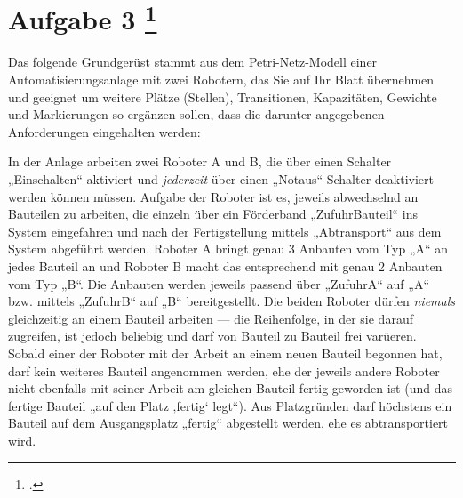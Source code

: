 \documentclass{lehramt-informatik-aufgabe}
\begin{document}
\section{Aufgabe 3
\footcite{examen:66116:2015:03}}

Das folgende Grundgerüst stammt aus dem Petri-Netz-Modell einer
Automatisierungsanlage mit zwei Robotern, das Sie auf Ihr Blatt
übernehmen und geeignet um weitere Plätze (Stellen), Transitionen,
Kapazitäten, Gewichte und Markierungen so ergänzen sollen, dass die
darunter angegebenen Anforderungen eingehalten werden:

In der Anlage arbeiten zwei Roboter A und B, die über einen Schalter
„Einschalten“ aktiviert und \emph{jederzeit} über einen
„Notaus“-Schalter deaktiviert werden können müssen. Aufgabe der Roboter ist es,
jeweils abwechselnd an Bauteilen zu arbeiten, die einzeln über ein
Förderband „ZufuhrBauteil“ ins System eingefahren und nach der
Fertigstellung mittels „Abtransport“ aus dem System abgeführt werden.
Roboter A bringt genau 3 Anbauten vom Typ „A“ an jedes Bauteil an und
Roboter B macht das entsprechend mit genau 2 Anbauten vom Typ „B“. Die
Anbauten werden jeweils passend über „ZufuhrA“ auf „A“ bzw. mittels
„ZufuhrB“ auf „B“ bereitgestellt. Die beiden Roboter dürfen
\emph{niemals} gleichzeitig an einem Bauteil arbeiten — die Reihenfolge,
in der sie darauf zugreifen, ist jedoch beliebig und darf von Bauteil zu
Bauteil frei varüeren. Sobald einer der Roboter mit der Arbeit an einem
neuen Bauteil begonnen hat, darf kein weiteres Bauteil angenommen
werden, ehe der jeweils andere Roboter nicht ebenfalls mit seiner Arbeit
am gleichen Bauteil fertig geworden ist (und das fertige Bauteil „auf
den Platz ‚fertig‘ legt“). Aus Platzgründen darf höchstens ein Bauteil
auf dem Ausgangsplatz „fertig“ abgestellt werden, ehe es abtransportiert
wird.
\end{document}
